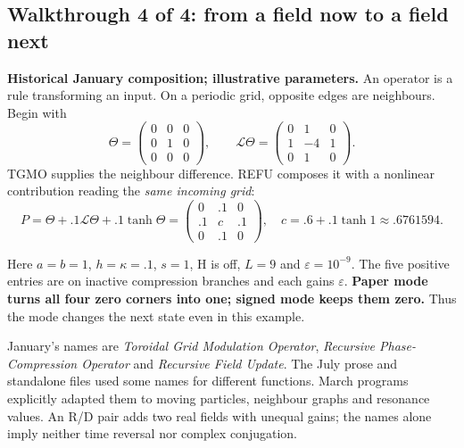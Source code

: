 \documentclass[11pt,a4paper]{article}
\begin{document}
\subsection*{Walkthrough 4 of 4: from a field now to a field next}
\noindent\textbf{Historical January composition; illustrative parameters.}
An operator is a rule transforming an input. On a periodic grid,
opposite edges are neighbours. Begin with
\[
\Theta=\begin{pmatrix}0&0&0\\0&1&0\\0&0&0\end{pmatrix},
\qquad
\mathcal L\Theta=\begin{pmatrix}0&1&0\\1&-4&1\\0&1&0\end{pmatrix}.
\]
TGMO supplies the neighbour difference. REFU composes it with a nonlinear
contribution reading the \emph{same incoming grid}:
\[
P=\Theta+.1\mathcal L\Theta+.1\tanh\Theta
=\begin{pmatrix}0&.1&0\\.1&c&.1\\0&.1&0\end{pmatrix},
\quad c=.6+.1\tanh1\approx.6761594.
\]
\begin{center}
\end{center}
Here $a=b=1$, $h=\kappa=.1$, $s=1$, H is off, $L=9$ and
$\varepsilon=10^{-9}$. The five positive entries are on inactive
compression branches and each gains $\varepsilon$.
\textbf{Paper mode turns all four zero corners into one; signed mode
keeps them zero.} Thus the mode changes the next state even in this example.

January's names are \emph{Toroidal Grid Modulation Operator},
\emph{Recursive Phase-Compression Operator} and
\emph{Recursive Field Update}.
The July prose and standalone files used some names for different functions.
March programs explicitly adapted them to moving particles,
neighbour graphs and resonance values. An R/D pair adds two real fields
with unequal gains; the names alone imply neither time reversal nor complex
conjugation.
\end{document}
